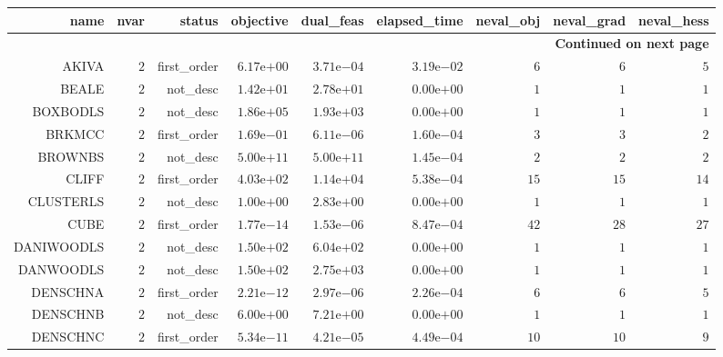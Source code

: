 \begin{longtable}{rrrrrrrrr}
\hline
name & nvar & status & objective & dual\_feas & elapsed\_time & neval\_obj & neval\_grad & neval\_hess \\\hline
\endhead
\hline
\multicolumn{9}{r}{{\bfseries Continued on next page}}\\
\hline
\endfoot
\endlastfoot
AKIVA & \(     2\) & first\_order & \( 6.17\)e\(+00\) & \( 3.71\)e\(-04\) & \( 3.19\)e\(-02\) & \(     6\) & \(     6\) & \(     5\) \\
BEALE & \(     2\) & not\_desc & \( 1.42\)e\(+01\) & \( 2.78\)e\(+01\) & \( 0.00\)e\(+00\) & \(     1\) & \(     1\) & \(     1\) \\
BOXBODLS & \(     2\) & not\_desc & \( 1.86\)e\(+05\) & \( 1.93\)e\(+03\) & \( 0.00\)e\(+00\) & \(     1\) & \(     1\) & \(     1\) \\
BRKMCC & \(     2\) & first\_order & \( 1.69\)e\(-01\) & \( 6.11\)e\(-06\) & \( 1.60\)e\(-04\) & \(     3\) & \(     3\) & \(     2\) \\
BROWNBS & \(     2\) & not\_desc & \( 5.00\)e\(+11\) & \( 5.00\)e\(+11\) & \( 1.45\)e\(-04\) & \(     2\) & \(     2\) & \(     2\) \\
CLIFF & \(     2\) & first\_order & \( 4.03\)e\(+02\) & \( 1.14\)e\(+04\) & \( 5.38\)e\(-04\) & \(    15\) & \(    15\) & \(    14\) \\
CLUSTERLS & \(     2\) & not\_desc & \( 1.00\)e\(+00\) & \( 2.83\)e\(+00\) & \( 0.00\)e\(+00\) & \(     1\) & \(     1\) & \(     1\) \\
CUBE & \(     2\) & first\_order & \( 1.77\)e\(-14\) & \( 1.53\)e\(-06\) & \( 8.47\)e\(-04\) & \(    42\) & \(    28\) & \(    27\) \\
DANIWOODLS & \(     2\) & not\_desc & \( 1.50\)e\(+02\) & \( 6.04\)e\(+02\) & \( 0.00\)e\(+00\) & \(     1\) & \(     1\) & \(     1\) \\
DANWOODLS & \(     2\) & not\_desc & \( 1.50\)e\(+02\) & \( 2.75\)e\(+03\) & \( 0.00\)e\(+00\) & \(     1\) & \(     1\) & \(     1\) \\
DENSCHNA & \(     2\) & first\_order & \( 2.21\)e\(-12\) & \( 2.97\)e\(-06\) & \( 2.26\)e\(-04\) & \(     6\) & \(     6\) & \(     5\) \\
DENSCHNB & \(     2\) & not\_desc & \( 6.00\)e\(+00\) & \( 7.21\)e\(+00\) & \( 0.00\)e\(+00\) & \(     1\) & \(     1\) & \(     1\) \\
DENSCHNC & \(     2\) & first\_order & \( 5.34\)e\(-11\) & \( 4.21\)e\(-05\) & \( 4.49\)e\(-04\) & \(    10\) & \(    10\) & \(     9\) \\

\end{longtable}
